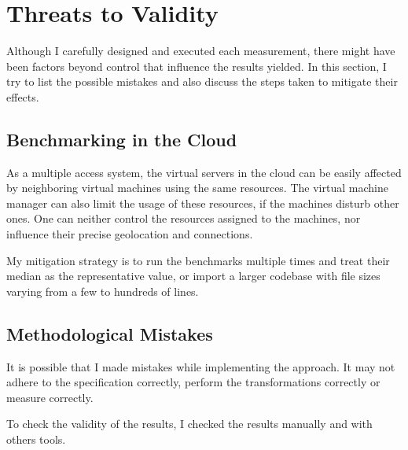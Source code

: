 \section{Threats to Validity}
\label{sect:evaluation-threats}
Although I carefully designed and executed each measurement, there might have been factors beyond control that influence the results yielded. In this section, I try to list the possible mistakes and also discuss the steps taken to mitigate their effects.

\subsection{Benchmarking in the Cloud} As a multiple access system, the virtual servers in the cloud can be easily affected by neighboring virtual machines using the same resources. The virtual machine manager can also limit the usage of these resources, if the machines disturb other ones. One can neither control the resources assigned to the machines, nor influence their precise geolocation and connections.

My mitigation strategy is to run the benchmarks multiple times and treat their median as the representative value, or import a larger codebase with file sizes varying from a few to hundreds of lines.

\subsection{Methodological Mistakes} It is possible that I made mistakes while implementing the approach. It may not adhere to the specification correctly, perform the transformations correctly or measure correctly.

To check the validity of the results, I checked the results manually and with others tools.
